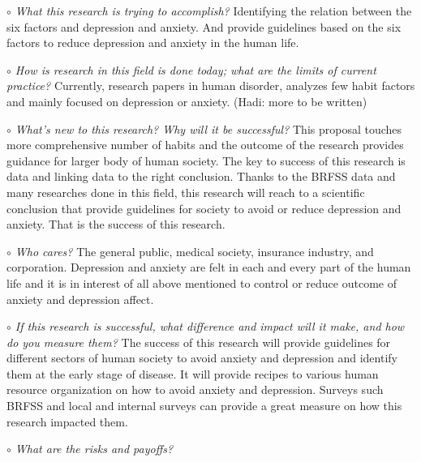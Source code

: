 \documentclass[letterpaper, 10 pt, conference]{ieeeconf}  %
\begin{document}
\noindent\textit{$\circ$ What this research is trying to accomplish?} \newline
\textnormal{
Identifying the relation between the six factors and depression and anxiety. 
And provide guidelines based on the six factors to reduce depression and anxiety in the human life.
}

\setlength{\parskip}{1em} %

\par\noindent\textit{$\circ$ How is research in this field is done today; what are the limits of current practice?}\newline
\textnormal{
Currently, research papers in human disorder, analyzes few habit factors 
and mainly focused on depression or anxiety. (Hadi: more to be written) 
}
\par\noindent\textit{$\circ$ What's new to this research? Why will it be successful?}\newline
\textnormal{
This proposal touches more comprehensive number of habits and the outcome of the 
research provides guidance for larger body of human society. The key to success 
of this research is data and linking data to the right conclusion. Thanks to the 
BRFSS data and many researches done in this field, this research will reach to a 
scientific conclusion that provide guidelines for society to avoid or reduce 
depression and anxiety. That is the success of this research.
}
\par\noindent\textit{$\circ$ Who cares?}\newline
\textnormal{
The general public, medical society, insurance industry, and corporation. Depression 
and anxiety are felt in each and every part of the human life and it is in interest 
of all above mentioned to control or reduce outcome of anxiety and depression affect.
}
\par\noindent\textit{$\circ$ If this research is successful, what difference and impact will it make, and how do you measure them?}\newline
\textnormal{
The success of this research will provide guidelines for different sectors of 
human society to avoid anxiety and depression and identify them at the early 
stage of disease. It will provide recipes to various human resource organization 
on how to avoid anxiety and depression. Surveys such BRFSS and local and internal 
surveys can provide a great measure on how this research impacted them.
}
\par\noindent\textit{$\circ$ What are the risks and payoffs?}\newline
\end{document}
